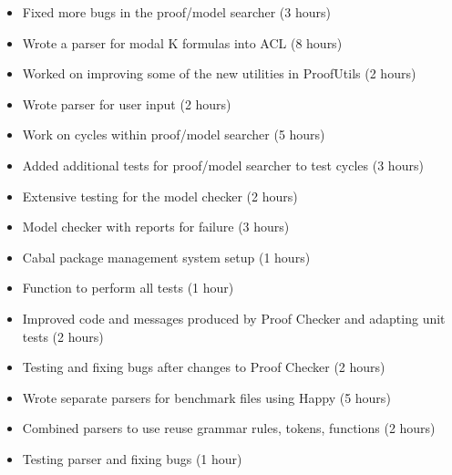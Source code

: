 %
{ \begin{itemize} 
 \item Fixed more bugs in the proof/model searcher (3 hours)
 \item Wrote a parser for modal K formulas into ACL (8 hours)
 \item Worked on improving some of the new utilities in ProofUtils (2 hours)
 \item Wrote parser for user input (2 hours)
 \end{itemize} 
}%
{ \begin{itemize} 
 \item Work on cycles within proof/model searcher (5 hours)
 \item Added additional tests for proof/model searcher to test cycles (3 hours)
 \end{itemize} 
}%
{ \begin{itemize} 
 \item Extensive testing for the model checker (2 hours)
 \item Model checker with reports for failure (3 hours)
 \item Cabal package management system setup (1 hours)
 \item Function to perform all tests (1 hour)
 \end{itemize} 
}%
{ \begin{itemize} 
 \item Improved code and messages produced by Proof Checker and adapting unit tests (2 hours)
 \item Testing and fixing bugs after changes to Proof Checker (2 hours)
 \item Wrote separate parsers for benchmark files using Happy (5 hours)
 \item Combined parsers to use reuse grammar rules, tokens, functions (2 hours)
 \item Testing parser and fixing bugs (1 hour)
 \end{itemize} 
}%

